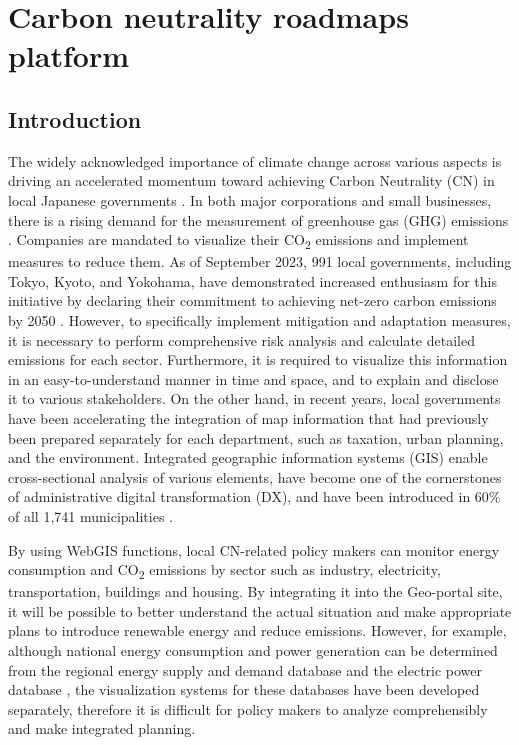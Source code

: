 \chapter{Carbon neutrality roadmaps platform} \label{chap5}
\renewcommand{\headrulewidth}{0pt}
\lhead[\thepage]{\leftmark}
\rhead[\leftmark]{\thepage}
\cfoot[]{}

\section{Introduction}

The widely acknowledged importance of climate change across various aspects \citep{primack2009impact, watanabe2009general, ogawa2013ecological, shibuya2016effect} is driving an accelerated momentum toward achieving Carbon Neutrality (CN) in local Japanese governments \citep{nakazawa2023net}. In both major corporations and small businesses, there is a rising demand for the measurement of greenhouse gas (GHG) emissions \citep{kauffmann2012corporate}. Companies are mandated to visualize their CO\textsubscript{2} emissions and implement measures to reduce them. As of September 2023, 991 local governments, including Tokyo, Kyoto, and Yokohama, have demonstrated increased enthusiasm for this initiative by declaring their commitment to achieving net-zero carbon emissions by 2050 \citep{zerocarboncities}. However, to specifically implement mitigation and adaptation measures, it is necessary to perform comprehensive risk analysis and calculate detailed emissions for each sector. Furthermore, it is required to visualize this information in an easy-to-understand manner in time and space, and to explain and disclose it to various stakeholders. On the other hand, in recent years, local governments have been accelerating the integration of map information that had previously been prepared separately for each department, such as taxation, urban planning, and the environment. Integrated geographic information systems (GIS) enable cross-sectional analysis of various elements, have become one of the cornerstones of administrative digital transformation (DX), and have been introduced in 60\% of all 1,741 municipalities \citep{nikkei}.\par

By using WebGIS functions, local CN-related policy makers can monitor energy consumption and CO\textsubscript{2} emissions by sector such as industry, electricity, transportation, buildings and housing. By integrating it into the Geo-portal site, it will be possible to better understand the actual situation and make appropriate plans to introduce renewable energy and reduce emissions. However, for example, although national energy consumption and power generation can be determined from the regional energy supply and demand database \citep{Toshihiko} and the electric power database \citep{kitamoto, nlftp}, the visualization systems for these databases have been developed separately, therefore it is difficult for policy makers to analyze comprehensibly and make integrated planning.\par


